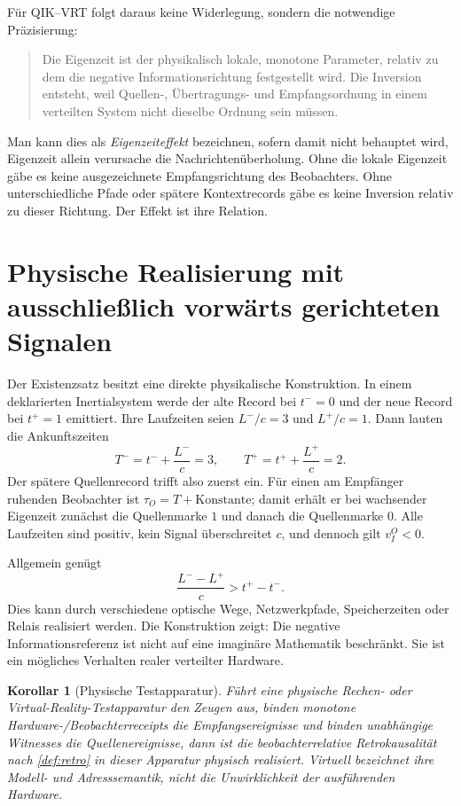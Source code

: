 \documentclass[11pt,a4paper]{article}
\newtheorem{korollar}{Korollar}[section]
\theoremstyle{remark}
\newcommand{\qikvrt}{QIK--VRT}
\begin{document}
Für \qikvrt{} folgt daraus keine Widerlegung, sondern die notwendige
Präzisierung:

\begin{quote}
Die Eigenzeit ist der physikalisch lokale, monotone Parameter, relativ zu dem
die negative Informationsrichtung festgestellt wird. Die Inversion entsteht,
weil Quellen-, Übertragungs- und Empfangsordnung in einem verteilten System
nicht dieselbe Ordnung sein müssen.
\end{quote}

Man kann dies als \emph{Eigenzeiteffekt} bezeichnen, sofern damit nicht
behauptet wird, Eigenzeit allein verursache die Nachrichtenüberholung. Ohne
die lokale Eigenzeit gäbe es keine ausgezeichnete Empfangsrichtung des
Beobachters. Ohne unterschiedliche Pfade oder spätere Kontextrecords gäbe es
keine Inversion relativ zu dieser Richtung. Der Effekt ist ihre Relation.

\section{Physische Realisierung mit ausschließlich vorwärts gerichteten Signalen}
\label{sec:physical}

Der Existenzsatz besitzt eine direkte physikalische Konstruktion. In einem
deklarierten Inertialsystem werde der alte Record bei \(t^-=0\) und der neue
Record bei \(t^+=1\) emittiert. Ihre Laufzeiten seien \(L^-/c=3\) und
\(L^+/c=1\). Dann lauten die Ankunftszeiten
\[
  T^-=t^-+\frac{L^-}{c}=3,
  \qquad
  T^+=t^++\frac{L^+}{c}=2.
\]
Der spätere Quellenrecord trifft also zuerst ein. Für einen am Empfänger
ruhenden Beobachter ist \(\tau_O=T+\text{Konstante}\); damit erhält er bei
wachsender Eigenzeit zunächst die Quellenmarke \(1\) und danach die
Quellenmarke \(0\). Alle Laufzeiten sind positiv, kein Signal überschreitet
\(c\), und dennoch gilt \(v_I^O<0\).

Allgemein genügt
\[
  \frac{L^- - L^+}{c}>t^+-t^-.
\]
Dies kann durch verschiedene optische Wege, Netzwerkpfade, Speicherzeiten
oder Relais realisiert werden. Die Konstruktion zeigt: Die negative
Informationsreferenz ist nicht auf eine imaginäre Mathematik beschränkt. Sie
ist ein mögliches Verhalten realer verteilter Hardware.

\begin{korollar}[Physische Testapparatur]
\label{cor:apparatus}
Führt eine physische Rechen- oder Virtual-Reality-Testapparatur den Zeugen aus,
binden monotone Hardware-/Beobachterreceipts die Empfangsereignisse und
binden unabhängige Witnesses die Quellenereignisse, dann ist die
beobachterrelative Retrokausalität nach \cref{def:retro} in dieser Apparatur
physisch realisiert. \emph{Virtuell} bezeichnet ihre Modell- und
Adresssemantik, nicht die Unwirklichkeit der ausführenden Hardware.
\end{korollar}
\end{document}
